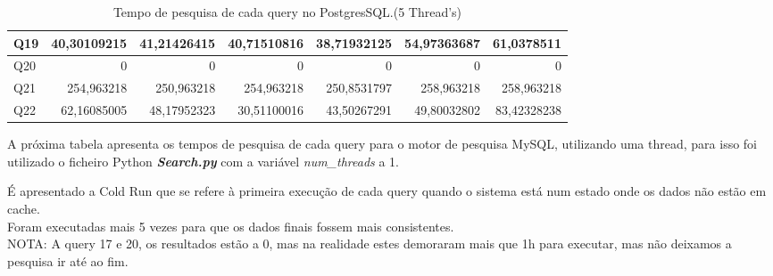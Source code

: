 \documentclass{article}
\begin{document}
\begin{table}[H]
{\begin{tabular}{|l|r|r|r|r|r|r|}
Q19&	40,30109215	&41,21426415&	40,71510816	&38,71932125&	54,97363687	&61,0378511\\ \hline
Q20&	0	& 0 & 	0 & 	0	& 0 & 	0\\ \hline
Q21&	254,963218	&250,963218	&254,963218	&250,8531797&	258,963218	&258,963218\\ \hline
Q22&	62,16085005	&48,17952323&	30,51100016	&43,50267291&	49,80032802	&83,42328238\\ \hline
    \end{tabular}}
    \caption{Tempo de pesquisa de cada query no PostgresSQL.(5 Thread's)}
    \label{tab:BC_Table6}
  \end{table}


  \clearpage

  \texttt{}\par A próxima tabela apresenta os tempos de pesquisa de cada query para o motor de pesquisa MySQL, utilizando uma thread, para isso foi utilizado o ficheiro Python \textbf{\textit{Search.py}}  com a variável \textit{num\_threads} a 1. 
  \texttt{}\par É apresentado a Cold Run que se refere à primeira execução de cada query quando o sistema está num estado onde os dados não estão em cache.\\
  Foram executadas mais 5 vezes para que os dados finais fossem mais consistentes.\\
  NOTA: A query 17 e 20, os resultados estão a 0, mas na realidade estes demoraram mais que 1h para executar, mas não deixamos a pesquisa ir até ao fim.
  
\end{document}
